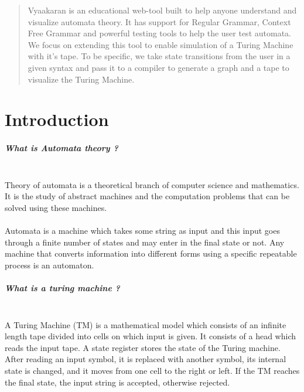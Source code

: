 \documentclass[12pt]{report}
\begin{document}
\begin{abstract}
Vyaakaran is an educational web-tool built to help anyone understand and visualize automata theory. It has support for Regular Grammar, Context Free Grammar and powerful testing tools to help the user test automata. We focus on extending this tool to enable simulation of a Turing Machine with it's tape. To be specific, we take state transitions from the user in a given syntax and pass it to a compiler to generate a graph and a tape to visualize the Turing Machine. 
\end{abstract}

\tableofcontents

\chapter{Introduction}

\paragraph{What is Automata theory ?\\\\}
Theory of automata is a theoretical branch of computer science and mathematics. It is the study of abstract machines and the computation problems that can be solved using these machines.\\\\
Automata is a machine which takes some string as input and this input goes through a finite number of states and may enter in the final state or not. Any machine that converts information into different forms using a specific repeatable process is an automaton.\\

\paragraph{What is a turing machine ?\\\\}

A Turing Machine (TM) is a mathematical model which consists of an infinite length tape divided into cells on which input is given. It consists of a head which reads the input tape. A state register stores the state of the Turing machine. After reading an input symbol, it is replaced with another symbol, its internal state is changed, and it moves from one cell to the right or left. If the TM reaches the final state, the input string is accepted, otherwise rejected.\\\\
\end{document}
